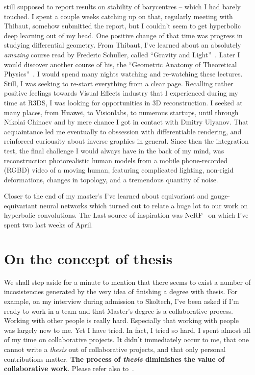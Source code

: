 still supposed to report results on stability of barycentres -- which I had
barely touched. I spent a couple weeks catching up on that, regularly meeting
with Thibaut, somehow submitted the report, but I couldn't seem to get
hyperbolic deep learning out of my head. One positive change of that time was
progress in studying differential geometry. From Thibaut, I've learned about an
absolutely \emph{amazing} course read by Frederic Schuller, called ``Gravity
and Light''~\citep{gravityLight}.  Later I would discover another course of
his, the ``Geometric Anatomy of Theoretical
Physics''~\citep{geometricAnatomy}. I would spend many nights watching and
re-watching these lectures.
Still, I was seeking to re-start everything from a clear page. Recalling rather
positive feelings towards Visual Effects industry that I experienced during my
time at R3DS, I was looking for opportunities in 3D reconstruction. I seeked at
many places, from Huawei, to Visionlabs, to numerous startups, until through
Nikolai Chinaev and by mere chance I got in contact with Dmitry Ulyanov.  That
acquaintance led me eventually to obssession with differentiable rendering, and
reinforced curiousity about inverse graphics in general. Since then the integration test,
the final challenge I would always have in the back of my mind, was
reconstruction photorealistic human models from a mobile phone-recorded (RGBD)
video of a moving human, featuring complicated lighting, non-rigid
deformations, changes in topology, and a tremendous quantity of noise.

Closer to the end of my master's I've learned about equivariant and
gauge-equivariant neural networks which turned out to relate a huge lot to our
work on hyperbolic convolutions. The Last source of inspiration was
NeRF~\cite{nerf} on which I've spent two last weeks of April.

\section*{On the concept of thesis}

We shall step aside for a minute to mention that there seems to exist a number
of incosistencies generated by the very idea of finishing a degree with thesis.
For example, on my interview during admission to Skoltech, I've been asked if
I'm ready to work in a team and that Master's degree is a collaborative
process. Working with other people is really hard. Especially that working with
people was largely new to me. Yet I have tried. In fact, I tried so hard, I
spent almost all of my time on collaborative projects. It didn't immediately
occur to me, that one cannot write a \emph{thesis} out of collaborative
projects, and that only personal contributions matter.
\textbf{The process of \emph{thesis} diminishes the value of collaborative work}.
Please refer also to~\citet{phdBullshit}.

